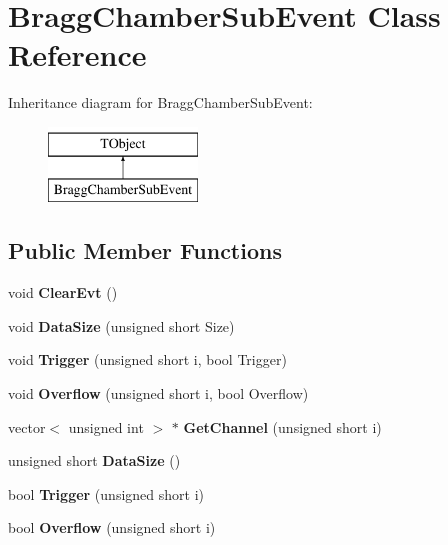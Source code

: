 \hypertarget{class_bragg_chamber_sub_event}{}\section{Bragg\+Chamber\+Sub\+Event Class Reference}
\label{class_bragg_chamber_sub_event}
Inheritance diagram for Bragg\+Chamber\+Sub\+Event\+:\begin{figure}[H]
\begin{center}
\leavevmode
\includegraphics[height=2.000000cm]{class_bragg_chamber_sub_event}
\end{center}
\end{figure}
\subsection*{Public Member Functions}
\begin{DoxyCompactItemize}
\item 
\mbox{\label{class_bragg_chamber_sub_event_a361384c90ff3a09bc91f1cc644c80e58}} 
void {\bfseries Clear\+Evt} ()
\item 
\mbox{\label{class_bragg_chamber_sub_event_a04c65ccc330d71355f8b642eabf6c464}} 
void {\bfseries Data\+Size} (unsigned short Size)
\item 
\mbox{\label{class_bragg_chamber_sub_event_af6d6ac1acdea729f2feefad5f897ff43}} 
void {\bfseries Trigger} (unsigned short i, bool Trigger)
\item 
\mbox{\label{class_bragg_chamber_sub_event_af67259ec99fc0a94706d61411567a5c9}} 
void {\bfseries Overflow} (unsigned short i, bool Overflow)
\item 
\mbox{\label{class_bragg_chamber_sub_event_ad6b036298bc77c069005948cebd4df7e}} 
vector$<$ unsigned int $>$ $\ast$ {\bfseries Get\+Channel} (unsigned short i)
\item 
\mbox{\label{class_bragg_chamber_sub_event_a0d98bf1a80709bcf8d36c479b9548ebd}} 
unsigned short {\bfseries Data\+Size} ()
\item 
\mbox{\label{class_bragg_chamber_sub_event_a2723e90238f9d3545f40d305621d7ec7}} 
bool {\bfseries Trigger} (unsigned short i)
\item 
\mbox{\label{class_bragg_chamber_sub_event_adca2567c05cb94ed4336ac0516d5e63a}} 
bool {\bfseries Overflow} (unsigned short i)
\end{DoxyCompactItemize}
